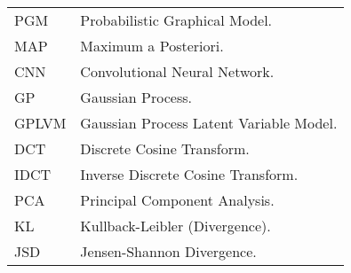 \begin{longtable}{p{} | p{}}
  PGM & Probabilistic Graphical Model.\\
  MAP & Maximum a Posteriori.\\
  CNN & Convolutional Neural Network.\\
  GP & Gaussian Process.\\
  GPLVM & Gaussian Process Latent Variable Model.\\
  DCT & Discrete Cosine Transform.\\
  IDCT & Inverse Discrete Cosine Transform.\\
  PCA & Principal Component Analysis.\\
  KL & Kullback-Leibler (Divergence).\\
  JSD & Jensen-Shannon Divergence.
~\label{table:abbreviations}
\end{longtable}